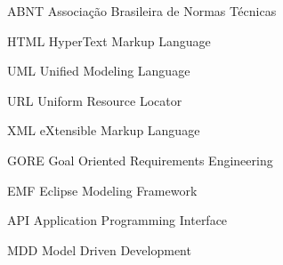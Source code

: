 \documentclass[
	12pt,				%
	openright,			%
	oneside,
	a4paper,			%
	english,			%
	french,				%
	spanish,			%
	brazil				%
	]{abntex2}
\begin{document}
\listoffigures*
\cleardoublepage


\listoftables*
\cleardoublepage


\begin{siglas}
  
  \item[ABNT] Associação Brasileira de Normas Técnicas
  
  \item[HTML] HyperText Markup Language

  \item[UML] Unified Modeling Language 

  \item[URL] Uniform Resource Locator
    
  \item[XML] eXtensible Markup Language
  
  \item[GORE] Goal Oriented Requirements Engineering
  
  \item[EMF] Eclipse Modeling Framework
  
  \item[API] Application Programming Interface
  
  \item[MDD] Model Driven Development
  
  
\end{siglas}



\tableofcontents*
\cleardoublepage




\textual







\end{document}
